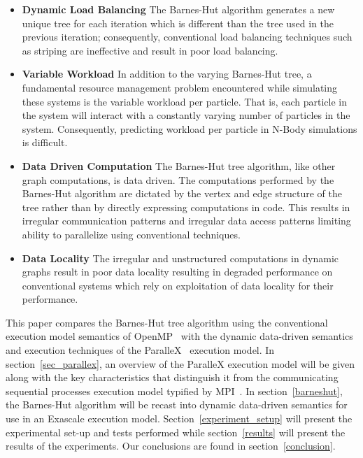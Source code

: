 \documentclass[floatfix]{revtex4}
\begin{document}
\begin{itemize}
 \item \textbf{Dynamic Load Balancing} The Barnes-Hut algorithm generates a new 
unique tree for each iteration which is different
than the tree used in the previous iteration; consequently,
conventional load balancing techniques such as striping are ineffective and 
result in poor load balancing. 
 \item \textbf{Variable Workload} In addition to the varying Barnes-Hut tree, 
a fundamental resource management problem
encountered while simulating these systems is the variable workload 
per particle. That is, each particle
in the system will interact with a constantly varying number of particles in the system. Consequently, predicting
workload per particle in N-Body simulations is difficult.
 \item \textbf{Data Driven Computation} The Barnes-Hut tree algorithm, like 
other graph computations, is data driven. The computations
performed by the Barnes-Hut algorithm are dictated by the vertex and edge 
structure of the tree rather than by directly
expressing computations in code. This results in irregular communication patterns and
irregular data access patterns limiting ability to parallelize using conventional techniques.
 \item \textbf{Data Locality} The irregular and unstructured computations in dynamic graphs result in poor data
locality resulting in degraded performance on conventional systems which rely on
exploitation of data locality for their performance.
 \end{itemize}

This paper compares the Barnes-Hut tree algorithm using the conventional execution model 
semantics of OpenMP~\cite{openmp1,openmp2} with the dynamic data-driven semantics and
execution techniques of the ParalleX~\cite{scaling_impaired_apps,tabbal} execution model.
In section~\ref{sec_parallex}, an overview of the ParalleX execution model will be given
along with the key characteristics that distinguish it from 
the communicating sequential processes execution
model typified by MPI~\cite{MPISpec}. In section~\ref{barneshut}, the Barnes-Hut algorithm will be 
recast into dynamic data-driven semantics for use in an Exascale execution model. 
Section~\ref{experiment_setup} will
present the experimental set-up and tests performed while section~\ref{results} will present
the results of the experiments. Our conclusions are found in section~\ref{conclusion}.
\end{document}
